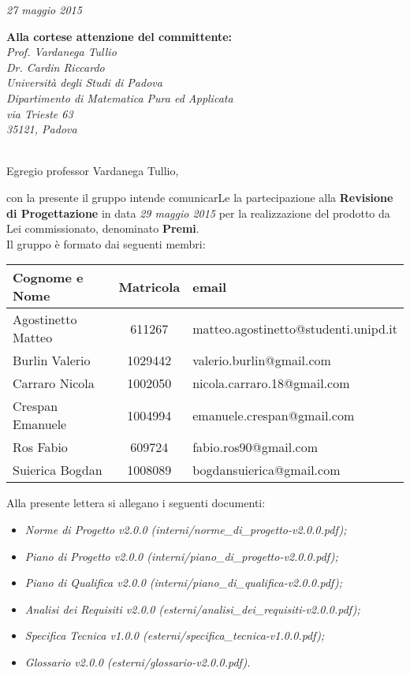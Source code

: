 \begin{flushright}
	\textit{27 maggio 2015} \\
\end{flushright}

\noindent \textbf{Alla cortese attenzione del committente:}\\
\textit{
	Prof. Vardanega Tullio\\
	Dr. Cardin Riccardo\\
	Università degli Studi di Padova\\
	Dipartimento di Matematica Pura ed Applicata\\
	via Trieste 63\\
	35121, Padova\\ \\
}


\noindent Egregio professor Vardanega Tullio,

con la presente il gruppo \GRUPPO intende comunicarLe la partecipazione alla \textbf{Revisione di Progettazione} in data \textit{29 maggio 2015} per la realizzazione del prodotto da Lei commissionato, denominato \textbf{Premi}.\\


\noindent Il gruppo è formato dai seguenti membri:\\

\begin{tabular}{|l|c|l|}
	\toprule
		\textbf{Cognome e Nome}  & \textbf{Matricola}  & \textbf{email}  \\ \midrule
		Agostinetto Matteo  & 611267 & matteo.agostinetto@studenti.unipd.it \\ 
		Burlin Valerio & 1029442 & valerio.burlin@gmail.com \\ 
		Carraro Nicola & 1002050 & nicola.carraro.18@gmail.com \\ 
		Crespan Emanuele & 1004994 & emanuele.crespan@gmail.com \\ 
		Ros Fabio & 609724 & fabio.ros90@gmail.com \\ 
		Suierica Bogdan  & 1008089 & bogdansuierica@gmail.com \\
		
	\bottomrule
\end{tabular}

\vspace{20px}

\noindent Alla presente lettera si allegano i seguenti documenti:
\begin{itemize}
	\item \textit{Norme di Progetto v2.0.0 (interni/norme\_di\_progetto-v2.0.0.pdf);}
	\item \textit{Piano di Progetto v2.0.0 (interni/piano\_di\_progetto-v2.0.0.pdf);}
	\item \textit{Piano di Qualifica v2.0.0 (interni/piano\_di\_qualifica-v2.0.0.pdf);}
	\item \textit{Analisi dei Requisiti v2.0.0 (esterni/analisi\_dei\_requisiti-v2.0.0.pdf);}
	\item \textit{Specifica Tecnica v1.0.0 (esterni/specifica\_tecnica-v1.0.0.pdf);}
	\item \textit{Glossario v2.0.0 (esterni/glossario-v2.0.0.pdf).}\\
\end{itemize}

